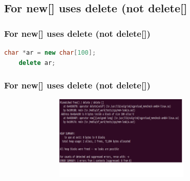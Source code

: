 \documentclass[10pt,xcolor={usenames,dvipsnames}]{beamer}
\begin{document}
\subsection{For new[] uses delete (not delete[]}

\begin{frame}[fragile]
	\frametitle{For new[] uses delete (not delete[])}
	\begin{center}
		\begin{lstlisting}[language=C++]
	char *ar = new char[100];
	delete ar;
		\end{lstlisting}
	\end{center}
\end{frame}

\begin{frame}[fragile]
	\frametitle{For new[] uses delete (not delete[])}
	\begin{center}
		\begin{figure}
			\includegraphics[height=4cm,width=10cm]{delete.png}
		\end{figure}
	\end{center}
\end{frame}
\end{document}
